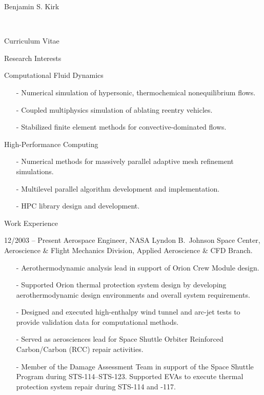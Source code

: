 \documentclass[11pt]{report}
\begin{document}
\begin{cv}{\centerline{Benjamin S. Kirk}\\
    \centerline{\small Curriculum Vitae}}
  \vspace{-.5em}
  \begin{cvlist}{Research Interests}
    \item[Computational Fluid Dynamics] \mbox{ }
      \begin{itemize}
        \small
        \item[-] Numerical simulation of hypersonic, thermochemical nonequilibrium flows.
        \item[-] Coupled multiphysics simulation of ablating reentry vehicles.
        \item[-] Stabilized finite element methods for convective-dominated flows.
      \end{itemize}
    \item[High-Performance Computing] \mbox{ }
      \begin{itemize}
        \small
        \item[-] Numerical methods for massively parallel adaptive mesh refinement simulations.
        \item[-] Multilevel parallel algorithm development and implementation.
        \item[-] HPC library design and development.
      \end{itemize}
  \end{cvlist}
  
  \vspace{-.5em}
  \begin{cvlist}{Work Experience}
    \item[12/2003 -- Present]
      Aerospace Engineer, NASA Lyndon B.\ Johnson Space Center, Aeroscience \& Flight Mechanics Division, Applied Aeroscience \& CFD Branch.
      \small
      \begin{itemize}
        \item[-]
          Aerothermodynamic analysis lead in support of Orion Crew Module design.
        \item[-]
          Supported Orion thermal protection system design by developing aerothermodynamic 
          design environments and overall system requirements.
        \item[-]
          Designed and executed high-enthalpy wind tunnel and arc-jet tests to provide 
          validation data for computational methods.
        \item[-] 
          Served as aerosciences lead for Space Shuttle Orbiter Reinforced Carbon/Carbon (RCC) 
          repair activities.
        \item[-]
          Member of the Damage Assessment Team in support of the Space Shuttle Program 
          during STS-114--STS-123.  Supported EVAs to execute thermal protection system 
          repair during STS-114 and -117.
      \end{itemize}
      \normalsize


\end{cvlist}
\end{cv}
\end{document}
